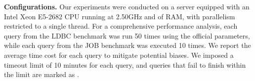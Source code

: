 
\vspace*{-2mm}
\noindent\textbf{Configurations. }
Our experiments were conducted on a server equipped with an Intel Xeon E5-2682 CPU running at 2.50GHz and  of RAM, with parallelism restricted to a single thread.
For a comprehensive performance analysis, each query from the LDBC benchmark was run 50 times using the official parameters, while each query from the JOB benchmark was executed 10 times. We report the average time cost for each query to mitigate potential biases.
We imposed a timeout limit of 10 minutes for each query, and queries that fail to finish within the limit are marked as \ot.

